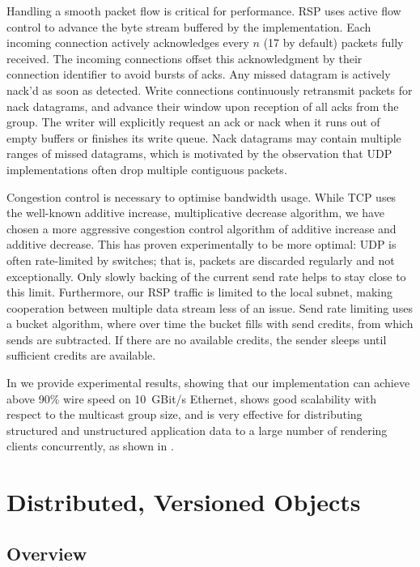 Handling a smooth packet flow is critical for performance. RSP uses active flow
control to advance the byte stream buffered by the implementation. Each incoming
connection actively acknowledges every $n$ (17 by default) packets fully
received. The incoming connections offset this acknowledgment by their
connection identifier to avoid bursts of acks. Any missed datagram is actively
nack'd as soon as detected. Write connections continuously retransmit packets
for nack datagrams, and advance their window upon reception of all acks from the
group. The writer will explicitly request an ack or nack when it runs out of
empty buffers or finishes its write queue. Nack datagrams may contain multiple
ranges of missed datagrams, which is motivated by the observation that UDP
implementations often drop multiple contiguous packets.

Congestion control is necessary to optimise bandwidth usage. While TCP uses the
well-known additive increase, multiplicative decrease algorithm, we have chosen
a more aggressive congestion control algorithm of additive increase and additive
decrease. This has proven experimentally to be more optimal: UDP is often
rate-limited by switches; that is, packets are discarded regularly and not
exceptionally. Only slowly backing of the current send rate helps to stay close
to this limit. Furthermore, our RSP traffic is limited to the local subnet,
making cooperation between multiple data stream less of an issue. Send rate
limiting uses a bucket algorithm, where over time the bucket fills with send
credits, from which sends are subtracted. If there are no available credits,
the sender sleeps until sufficient credits are available.

In \cite{ESP:18} we provide experimental results, showing that our
implementation can achieve above 90\% wire speed on 10~GBit/s Ethernet, shows
good scalability with respect to the multicast group size, and is very effective
for distributing structured and unstructured application data to a large number
of rendering clients concurrently, as shown in .


\section{Distributed, Versioned Objects}

\subsection{Overview}

